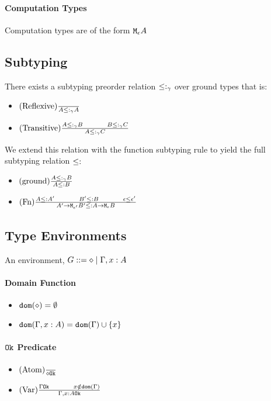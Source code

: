 \documentclass{report}
\begin{document}
        \paragraph{Computation Types}
        Computation types are of the form $\texttt{M}_{\epsilon}{A}$

    \subsection{Subtyping}
        There exists a subtyping preorder relation $\leq:_{\gamma}$ over ground types that is:
        \begin{itemize}
            \item $(\text{Reflexive}) \frac{}{A \leq:_{\gamma} A}$
            \item $\treerule{Transitive}{A \subtype_{\ground} B \s \s B \subtype_{\ground} C}{A \subtype_{\ground} C}$
        \end{itemize}

        We extend this relation with the function subtyping rule to yield the full subtyping relation $\leq:$

        \begin{itemize}
            \item $(\text{ground}) \frac{A \leq:_{\gamma} B}{A \leq: B}$
            \item $\treerule{Fn}{A \subtype A' \s\s B' \subtype B \s \s \e \subeffect \e'}{\lamtype{A'}{\e'}{B'} \subtype \lamtype{A}{\e}{B}}$
        \end{itemize}
    \subsection{Type Environments}
    An environment, $G ::= \diamond \mid \Gamma, x: A$ 
    \paragraph{Domain Function}
    \begin{itemize}
        \item $\texttt{dom}(\diamond) = \emptyset$
        \item $\texttt{dom}(\Gamma, x: A) =  \texttt{dom}(\Gamma)  \cup \left\{x \right\}$
    \end{itemize}
    \paragraph{$\texttt{Ok}$ Predicate}
    \begin{itemize}
        \item $(\text{Atom}) \frac{}{\diamond \texttt{Ok}}$
        \item $\treerule{Var}{\ok{\G} \s\s x\notin \dom{\G}}{\ok{\gax}}$
    \end{itemize}
\end{document}
